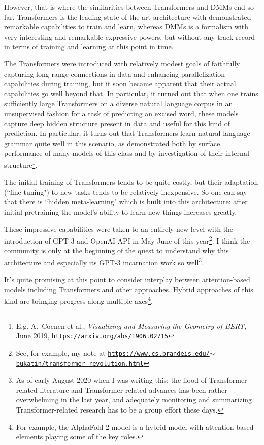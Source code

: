 \documentclass{article}
\begin{document}
However, that is where the similarities between Transformers and DMMs end so far. 
Transformers is the leading state-of-the-art architecture
with demonstrated remarkable capabilities to train and learn, whereas DMMs is a formalism with very interesting
and remarkable expressive powers, but without any track record in terms of training and learning at this
point in time.

The Transformers were introduced with relatively
modest goals of faithfully capturing long-range connections in data and enhancing parallelization capabilities
during training, but it soon became apparent that their actual capabilities go well beyond that. In particular,
it turned out that when one trains sufficiently large Transformers on a diverse natural language corpus
in an unsupervised fashion for a task of predicting an excised word, these models capture deep hidden structure present
in data and
useful for this kind of prediction. In particular, it turns out that Transformers learn natural language grammar quite
well in this scenario, as demonstrated both by surface performance of many models of this class and by
investigation of their internal structure\footnote{E.g. A.~Coenen et al., {\em Visualizing and Measuring the Geometry of BERT}, June 2019, \href{https://arxiv.org/abs/1906.02715}{\tt https://arxiv.org/abs/1906.02715}}.

The initial training of Transformers tends to be quite costly, but their adaptation (``fine-tuning") to new tasks
tends to be relatively inexpensive. So one can say that there is ``hidden meta-learning" which is built into
this architecture: after initial pretraining the model's ability to learn new things increases greatly.

These impressive capabilities were taken to an entirely new level with the introduction of GPT-3 and OpenAI API in
May-June of this year\footnote{See, for example, my note at \href{https://www.cs.brandeis.edu/~bukatin/transformer\_revolution.html}{\tt https://www.cs.brandeis.edu/$\sim$bukatin/transformer\_revolution.html}}. I think the community is only at the beginning
of the quest to understand why this architecture and especially its GPT-3 incarnation work so well\footnote{As of early August 2020 when I was writing this; the flood of Transformer-related literature and Transformer-related advances has been rather overwhelming in the last year, and adequately monitoring
and summarizing Transformer-related research has to be a group effort these days.}.

It's quite promising at this point to consider interplay between attention-based models including Transformers and
other approaches. Hybrid approaches of this kind are bringing progress along multiple axes\footnote{For example,
the AlphaFold 2 model is a hybrid model with attention-based elements playing some of the key roles.}.
\end{document}
